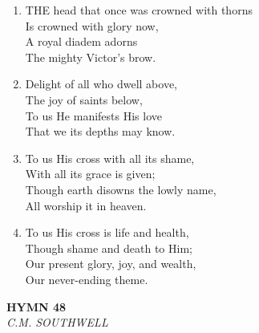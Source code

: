 \documentclass[11pt,a4paper]{article}
\begin{document}
\begin{enumerate}
    \item THE head that once was crowned with thorns \\
        Is crowned with glory now, \\
        A royal diadem adorns \\
        The mighty Victor's brow.

    \item Delight of all who dwell above, \\
        The joy of saints below, \\
        To us He manifests His love \\
        That we its depths may know.

    \item To us His cross with all its shame, \\
        With all its grace is given; \\
        Though earth disowns the lowly name, \\
        All worship it in heaven.

    \item To us His cross is life and health, \\
        Though shame and death to Him; \\
        Our present glory, joy, and wealth, \\
        Our never-ending theme.

\end{enumerate}

\newpage
\begin{center}
    {\Large \textbf{HYMN 48}}
    \\
    \textit{C.M. SOUTHWELL}
\end{center}
\vspace{1em}
\end{document}
